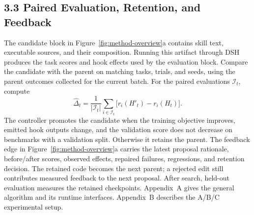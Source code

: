 \subsection*{3.3 Paired Evaluation, Retention, and Feedback}
The candidate block in Figure~\ref{fig:method-overview}a contains skill text, executable sources, and their composition. Running this artifact through DSH produces the task scores and hook effects used by the evaluation block. Compare the candidate with the parent on matching tasks, trials, and seeds, using the parent outcomes collected for the current batch. For the paired evaluations $\mathcal I_t$, compute
\begin{equation}
\widehat\Delta_t=\frac{1}{|\mathcal I_t|}\sum_{i\in\mathcal I_t}
\big[r_i(H'_t)-r_i(H_t)\big].
\label{eq:paired}
\end{equation}
The controller promotes the candidate when the training objective improves, emitted hook outputs change, and the validation score does not decrease on benchmarks with a validation split. Otherwise it retains the parent. The feedback edge in Figure~\ref{fig:method-overview}a carries the latest proposal rationale, before/after scores, observed effects, repaired failures, regressions, and retention decision. The retained code becomes the next parent; a rejected edit still contributes measured feedback to the next proposal. After search, held-out evaluation measures the retained checkpoints. Appendix~A gives the general algorithm and its runtime interfaces. Appendix~B describes the A/B/C experimental setup.
